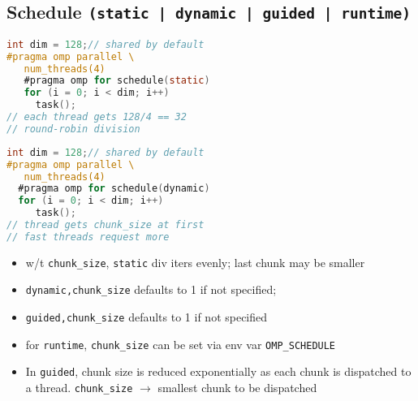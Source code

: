 \subsection*{Schedule \texttt{(static | dynamic | guided | runtime)}}
\begin{minipage}{0.5\linewidth}
\begin{lstlisting}[language=C,xrightmargin=3pt]
int dim = 128;// shared by default
#pragma omp parallel \
   num_threads(4)
   #pragma omp for schedule(static)
   for (i = 0; i < dim; i++)
     task();
// each thread gets 128/4 == 32
// round-robin division
\end{lstlisting}
\end{minipage}
\begin{minipage}{0.5\linewidth}
\begin{lstlisting}[language=C,xleftmargin=3pt]
int dim = 128;// shared by default
#pragma omp parallel \
   num_threads(4)
  #pragma omp for schedule(dynamic)
  for (i = 0; i < dim; i++)
     task();
// thread gets chunk_size at first
// fast threads request more
\end{lstlisting}
\end{minipage}
\begin{itemize}
\item w/t \texttt{chunk\_size}, \texttt{static} div iters evenly; last chunk may be smaller
\item \texttt{dynamic,chunk\_size} defaults to 1 if not specified;
\item \texttt{guided,chunk\_size} defaults to 1 if not specified
\item for \texttt{runtime}, \texttt{chunk\_size} can be set via env var \texttt{OMP\_SCHEDULE}
\item In \texttt{guided}, chunk size is reduced exponentially as each chunk is dispatched to a thread. \texttt{chunk\_size} $\rightarrow$ smallest chunk to be dispatched
\end{itemize}
